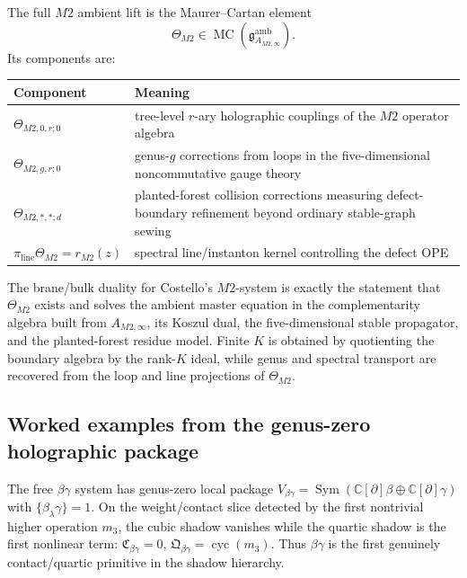 \begin{definition}
\ClaimStatusConjectured
The full $M2$ ambient lift is the Maurer--Cartan element
\[
\Theta_{M2}
\in
\operatorname{MC}(\mathfrak{g}^{\mathrm{amb}}_{A_{M2,\infty}}).
\]
Its components are:
\begin{center}
\begin{tabular}{@{}p{}p{}@{}}
\toprule
Component & Meaning \\
\midrule
$\Theta_{M2,0,r;0}$ & tree-level $r$-ary holographic
couplings of the $M2$ operator algebra \\
$\Theta_{M2,g,r;0}$ & genus-$g$ corrections from loops in
the five-dimensional noncommutative gauge theory \\
$\Theta_{M2,\ast,\ast;d}$ & planted-forest collision
corrections measuring defect-boundary refinement beyond
ordinary stable-graph sewing \\
$\pi_{\mathrm{line}}\Theta_{M2} = r_{M2}(z)$ & spectral
line/instanton kernel controlling the defect OPE \\
\bottomrule
\end{tabular}
\end{center}
\end{definition}

\begin{conjecture}
\ClaimStatusConjectured
The brane/bulk duality for Costello's $M2$-system is exactly the
statement that $\Theta_{M2}$ exists and solves the ambient master
equation in the complementarity algebra built from
$A_{M2,\infty}$, its Koszul dual, the five-dimensional stable
propagator, and the planted-forest residue model. Finite $K$ is
obtained by quotienting the boundary algebra by the rank-$K$ ideal,
while genus and spectral transport are recovered from the loop and
line projections of $\Theta_{M2}$.
\end{conjecture}

\subsection{Worked examples from the genus-zero holographic package}

\begin{example}
The free $\beta\gamma$ system has genus-zero local package
$V_{\beta\gamma} = \operatorname{Sym}(\mathbb{C}[\partial]\beta
\oplus \mathbb{C}[\partial]\gamma)$ with
$\{\beta_\lambda\gamma\} = 1$. On the weight/contact slice
detected by the first nontrivial higher operation $m_3$, the cubic
shadow vanishes while the quartic shadow is the first nonlinear
term:
$\mathfrak{C}_{\beta\gamma} = 0$,
$\mathfrak{Q}_{\beta\gamma} = \operatorname{cyc}(m_3)$.
Thus $\beta\gamma$ is the first genuinely contact/quartic primitive
in the shadow hierarchy.
\end{example}

